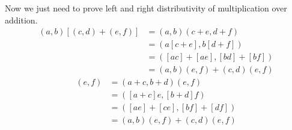 \documentclass[12pt]{report}
\begin{document}
Now we just need to prove left and right distributivity of multiplication over addition.
\begin{align*}
    (a,b)[(c,d) + (e,f)] &= (a,b)(c + e, d + f) \\
    &= (a[c + e], b[d + f]) \\
    &= ([ac] + [ae], [bd] + [bf]) \\
    &= (a,b)(e,f) + (c,d)(e,f)
\end{align*}
\begin{align*}
    [(a,b) + (c,d)](e,f) &= (a + c, b + d)(e,f) \\
    &= ([a + c]e, [b + d]f) \\
    &= ([ae] + [ce], [bf] + [df]) \\
    &= (a,b)(e,f) + (c,d)(e,f)
\end{align*}
\end{document}
